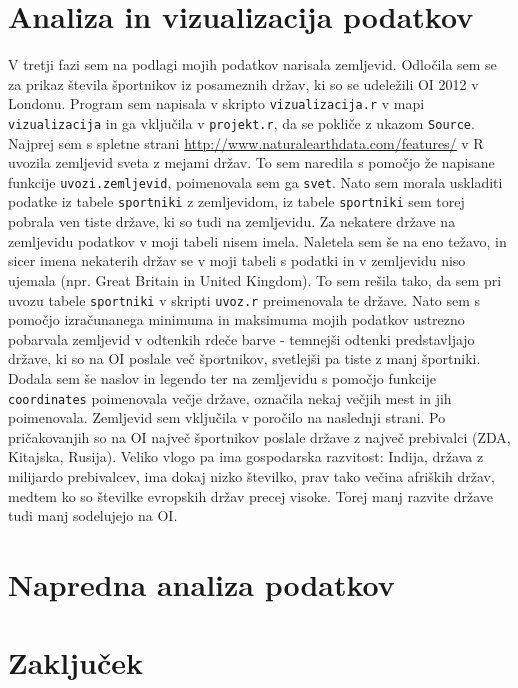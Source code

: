 \documentclass[11pt,a4paper]{article}
\begin{document}


\section{Analiza in vizualizacija podatkov}
V tretji fazi sem na podlagi mojih podatkov narisala zemljevid. Odločila sem se za prikaz števila športnikov iz posameznih držav, ki so se udeležili OI 2012 v Londonu.
\newline
Program sem napisala v skripto \verb|vizualizacija.r| v mapi \verb|vizualizacija| in ga vključila v \verb|projekt.r|, da se pokliče z ukazom \verb|Source|.
\newline
Najprej sem s spletne strani \url{http://www.naturalearthdata.com/features/} v R uvozila zemljevid sveta z mejami držav. To sem naredila s pomočjo že napisane funkcije \verb|uvozi.zemljevid|, poimenovala sem ga \verb|svet|. Nato sem morala uskladiti 
podatke iz tabele \verb|sportniki| z zemljevidom, iz tabele \verb|sportniki| sem torej pobrala ven tiste države, ki so tudi na zemljevidu. Za nekatere države na zemljevidu podatkov v moji tabeli nisem imela. Naletela sem še na eno težavo, in sicer imena nekaterih držav se v moji tabeli s podatki in v zemljevidu niso ujemala (npr. Great Britain in United Kingdom). To sem rešila tako, da sem pri uvozu tabele \verb|sportniki| v skripti \verb|uvoz.r| preimenovala te države.
\newline
Nato sem s pomočjo izračunanega minimuma in maksimuma mojih podatkov ustrezno pobarvala zemljevid v odtenkih rdeče barve - temnejši odtenki predstavljajo države, ki so na OI poslale več športnikov, svetlejši pa tiste z manj športniki.
Dodala sem še naslov in legendo ter na zemljevidu s pomočjo funkcije \verb|coordinates| poimenovala večje države, označila nekaj večjih mest in jih poimenovala.
\newline
Zemljevid sem vključila v poročilo na naslednji strani. Po pričakovanjih so na OI največ športnikov poslale države z največ prebivalci (ZDA, Kitajska, Rusija). Veliko vlogo pa ima gospodarska razvitost: Indija, država z milijardo prebivalcev, ima dokaj nizko številko, prav tako večina afriških držav, medtem ko so številke evropskih držav precej visoke. Torej manj razvite države tudi manj sodelujejo na OI.


\newpage
\section{Napredna analiza podatkov}

\section{Zaključek}
\end{document}
